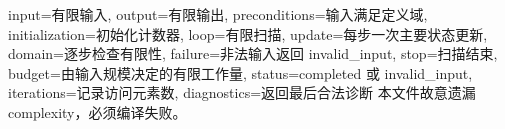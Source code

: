 \documentclass[UTF8,a4paper,11pt,openany]{ctexbook}
\begin{document}
\begin{AlgorithmContract}{
  input={有限输入},
  output={有限输出},
  preconditions={输入满足定义域},
  initialization={初始化计数器},
  loop={有限扫描},
  update={每步一次主要状态更新},
  domain={逐步检查有限性},
  failure={非法输入返回 invalid_input},
  stop={扫描结束},
  budget={由输入规模决定的有限工作量},
  status={completed 或 invalid_input},
  iterations={记录访问元素数},
  diagnostics={返回最后合法诊断}
}
本文件故意遗漏 complexity，必须编译失败。
\end{AlgorithmContract}
\end{document}
